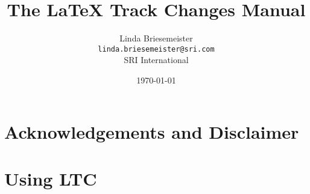 \documentclass{report}
\title{The \LaTeX{} Track Changes Manual}
\author{%
Linda Briesemeister\\
\texttt{linda.briesemeister@sri.com}\\
SRI International
}
\date{\today}
\begin{document}
\maketitle

\tableofcontents

\chapter*{Acknowledgements and Disclaimer}




\chapter{Using LTC}







%


\end{document}
